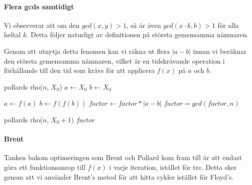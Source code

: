 \documentclass[a4paper,12pt]{article}
\renewcommand{\*}{\ensuremath{\cdot}}
\begin{document}
\paragraph{Flera gcds samtidigt}

Vi observerar att om den $gcd(x, y) > 1$, så är även $gcd(x\cdot k, b)>1$ för alla heltal $k$. Detta följer naturligt av definitionen på största gemensamma nämnaren.

Genom att utnytja detta fenomen kan vi räkna ut flera $|a-b|$ innan vi beräknar den största gemensamma nämnaren, vilket är en tidskrävande operation i förhållande till den tid som krävs för att applicera $f(x)$ på $a$ och $b$.

\begin{algorithmic}
    \STATE pollards rho($n$, $X_0$)
        \STATE $a \gets X_0 $
        \STATE $b \gets X_0 $

                \STATE $a \gets f(a)$
                \STATE $b \gets f(f(b))$
                \STATE $factor \gets factor * |a-b|$
            \ENDFOR
            \STATE $factor = gcd(factor, n)$
        \ENDWHILE

            \STATE {}
            \RETURN pollards rho($n$, $X_0+1$) 
            \RETURN $factor$
        \ENDIF
\end{algorithmic}

\paragraph{Brent}

Tanken bakom optimeringen som Brent och Pollard kom fram till är att endast göra ett funktionsanrop till $f(x)$ i varje iteration, istället för tre. Detta sker genom att vi använder Brent's metod för att hitta cykler istället för Floyd's. 
\end{document}
